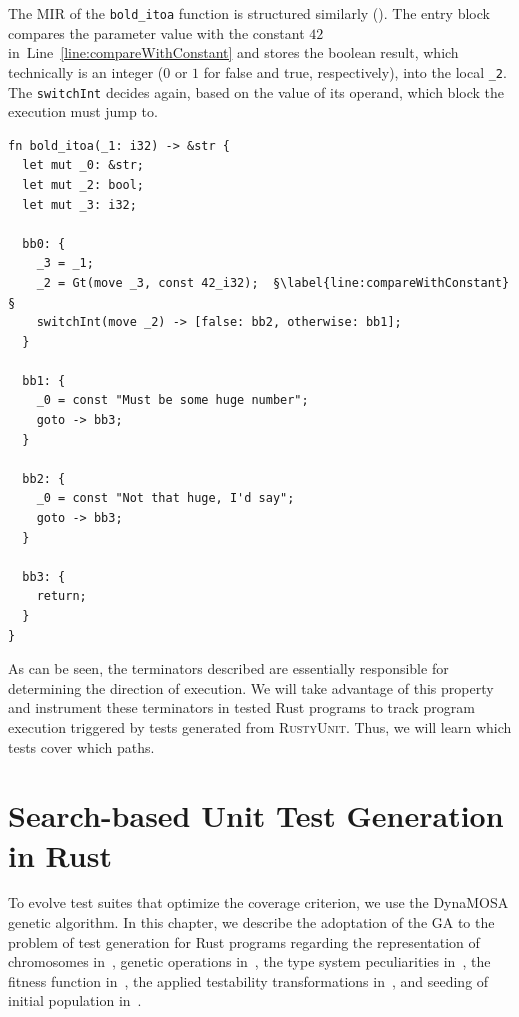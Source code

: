 \documentclass[paper=a4,%
  twoside,%
  BCOR4mm,%
  abstract=true,%
  toc=bibliography,%
  chapterprefix=true,%
  toc=bibliographynumbered,%
  open=right,%
  english,%
  pagesize=pdftex]{scrreprt}
\newcommand{\tech}{\textsc{RustyUnit}\xspace}
\newcommand{\mir}{\ac{MIR}\xspace}
\begin{document}
The \mir of the \texttt{bold\string_itoa} function is structured similarly (). The entry block compares the parameter value with the constant $42$ in~Line~\ref{line:compareWithConstant} and stores the boolean result, which technically is an integer ($0$ or $1$ for false and true, respectively), into the local \texttt{\string_2}. The \texttt{switchInt} decides again, based on the value of its operand, which block the execution must jump to.  

\begin{lstlisting}[style=boxed, escapechar=§, caption={\mir of the \texttt{bold\string_itoa} function}, label=lst:mir-lowered-second]
fn bold_itoa(_1: i32) -> &str {
  let mut _0: &str;                    
  let mut _2: bool;                    
  let mut _3: i32;                     

  bb0: {
    _3 = _1;                         
    _2 = Gt(move _3, const 42_i32);  §\label{line:compareWithConstant}§
    switchInt(move _2) -> [false: bb2, otherwise: bb1]; 
  }

  bb1: {
    _0 = const "Must be some huge number"; 
    goto -> bb3;
  }

  bb2: {
    _0 = const "Not that huge, I'd say";
    goto -> bb3;                     
  }

  bb3: {
    return;                          
  }
}
\end{lstlisting}

As can be seen, the terminators described are essentially responsible for determining the direction of execution. We will take advantage of this property and instrument these terminators in tested Rust programs to track program execution triggered by tests generated from \tech. Thus, we will learn which tests cover which paths.

\clearpage
\chapter{Search-based Unit Test Generation in Rust}
\label{chap:sbst-in-rust}
To evolve test suites that optimize the coverage criterion, we use the DynaMOSA genetic algorithm. In this chapter, we describe the adoptation of the \ac{GA} to the problem of test generation for Rust programs regarding the representation of chromosomes in~, genetic operations in~, the type system peculiarities in~, the fitness function in~, the applied testability transformations in~, and seeding of initial population in~. 
\end{document}
